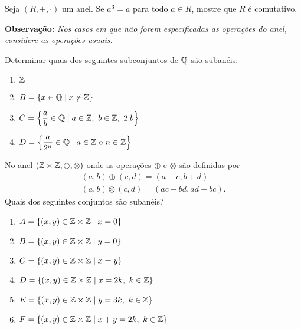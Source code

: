 \documentclass[12pt]{exam}
\begin{document}
    \questao{} Seja $(R, +, \cdot)$ um anel. Se $a^3 = a$ para todo $a \in R$, mostre que $R$ é comutativo.

    \vspace{1cm}

    \textbf{Observação: }\textit{Nos casos em que n\~ao forem especificadas as opera\c{c}\~oes do anel, considere as opera\c{c}\~oes usuais.}

    \vspace{.6cm}

    \questao{} Determinar quais dos seguintes subconjuntos de $\mathbb{Q}$ s{\~a}o suban{\'e}is:
        \begin{multicols}{2}
            \begin{enumerate}[label=({\alph*})]
                \item $\mathbb{Z}$
                \item $B = \{x \in \mathbb{Q} \mid x \notin \mathbb{Z}\}$
                \item $C = \left\{\dfrac{a}{b} \in \mathbb{Q} \mid a \in \mathbb{Z},\ b \in \mathbb{Z},\ 2 |b \right\}$
                \item $D = \left\{\dfrac{a}{2^n} \in \mathbb{Q} \mid a \in \mathbb{Z} \mbox{ e } n \in \mathbb{Z} \right\}$
            \end{enumerate}
        \end{multicols}


    \vspace{.3cm}

    \questao{} No anel $(\mathbb{Z} \times \mathbb{Z}, \oplus, \otimes)$ onde as opera\c{c}\~oes $\oplus$ e $\otimes$ s\~ao definidas por
    \begin{align*}
        (a, b) \oplus (c, d) = (a + c, b + d)\\
        (a ,b) \otimes (c, d) = (ac - bd, ad + bc).
    \end{align*}
    Quais dos seguintes conjuntos s\~ao suban\'eis?
    \begin{enumerate}[label=({\alph*})]
        \item $A = \{(x, y) \in \mathbb{Z} \times \mathbb{Z} \mid x = 0\}$
        \item $B = \{(x, y) \in \mathbb{Z} \times \mathbb{Z} \mid y = 0\}$
        \item $C = \{(x, y) \in \mathbb{Z} \times \mathbb{Z} \mid x = y\}$
        \item $D = \{(x, y) \in \mathbb{Z} \times \mathbb{Z} \mid x = 2k,\ k \in \mathbb{Z}\}$
        \item $E = \{(x, y) \in \mathbb{Z} \times \mathbb{Z} \mid y = 3k,\ k \in \mathbb{Z}\}$
        \item $F = \{(x, y) \in \mathbb{Z} \times \mathbb{Z} \mid x + y = 2k,\ k \in \mathbb{Z}\}$
    \end{enumerate}
\end{document}
